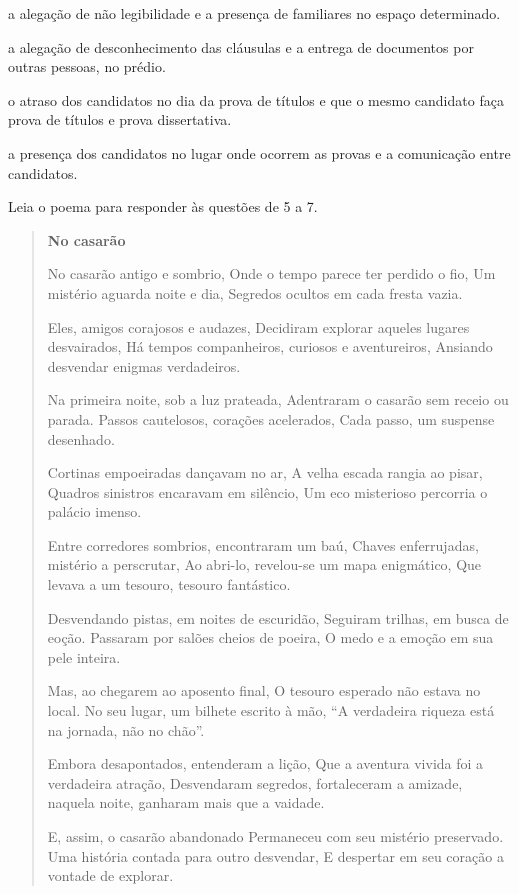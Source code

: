 \begin{escolha}
\item a alegação de não legibilidade e a presença de familiares no espaço
determinado.

\item a alegação de desconhecimento das cláusulas e a entrega de
documentos por outras pessoas, no prédio.

\item o atraso dos candidatos no dia da prova de títulos e que o mesmo
candidato faça prova de títulos e prova dissertativa.

\item a presença dos candidatos no lugar onde ocorrem as provas e a
comunicação entre candidatos.
\end{escolha}

Leia o poema para responder às questões de 5 a 7.

\begin{quote}
\textbf{No casarão}


No casarão antigo e sombrio, Onde o tempo parece ter perdido o fio, Um
mistério aguarda noite e dia, Segredos ocultos em cada fresta vazia.

Eles, amigos corajosos e audazes, Decidiram explorar aqueles lugares
desvairados, Há tempos companheiros, curiosos e aventureiros, Ansiando
desvendar enigmas verdadeiros.

Na primeira noite, sob a luz prateada, Adentraram o casarão sem receio
ou parada. Passos cautelosos, corações acelerados, Cada passo, um
suspense desenhado.

Cortinas empoeiradas dançavam no ar, A velha escada rangia ao pisar,
Quadros sinistros encaravam em silêncio, Um eco misterioso percorria o
palácio imenso.

Entre corredores sombrios, encontraram um baú, Chaves enferrujadas,
mistério a perscrutar, Ao abri-lo, revelou-se um mapa enigmático, Que
levava a um tesouro, tesouro fantástico.

Desvendando pistas, em noites de escuridão, Seguiram trilhas, em busca
de eoção. Passaram por salões cheios de poeira, O medo e a emoção em sua
pele inteira.

Mas, ao chegarem ao aposento final, O tesouro esperado não estava no
local. No seu lugar, um bilhete escrito à mão, ``A verdadeira riqueza
está na jornada, não no chão''.

Embora desapontados, entenderam a lição, Que a aventura vivida foi a
verdadeira atração, Desvendaram segredos, fortaleceram a amizade,
naquela noite, ganharam mais que a vaidade.

E, assim, o casarão abandonado Permaneceu com seu mistério preservado.
Uma história contada para outro desvendar, E despertar em seu coração a
vontade de explorar.

\end{quote}

